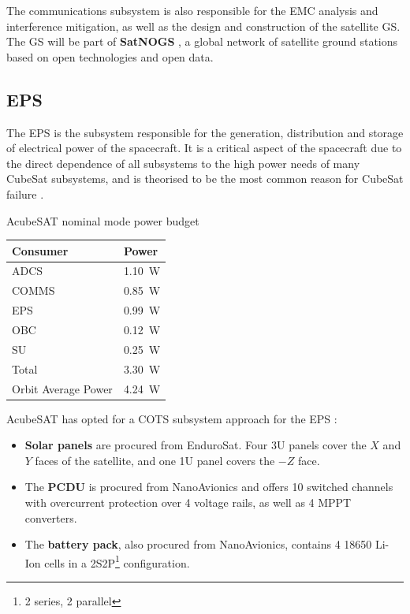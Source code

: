 \documentclass[a4paper,nobib]{tufte-book}
\begin{document}
The communications subsystem is also responsible for the \ac{EMC} analysis and interference mitigation, as well as the design and construction of the satellite \acl{GS}. The \acl{GS} will be part of \textbf{SatNOGS} \autocite{white_overview_satellite_2018}, a global network of satellite ground stations based on open technologies and open data.

\subsection{\acf{EPS}}
The \ac{EPS} is the subsystem responsible for the generation, distribution and storage of electrical power of the spacecraft. It is a critical aspect of the spacecraft due to the direct dependence of all subsystems to the high power needs of many CubeSat subsystems, and is theorised to be the most common reason for CubeSat failure \autocite{langer_reliability_cubesats_2016}.

\begin{margintable}
	\caption{AcubeSAT nominal mode power budget}
	\label{tab:power_budget}
	\begin{tabularx}{\linewidth}{@{}lX@{}}
		\toprule
		\textbf{Consumer}            & \textbf{Power}            \\ \midrule
		\acs{ADCS}          & \SI{1.10}{\watt} \\
		\acs{COMMS}         & \SI{0.85}{\watt} \\
		\acs{EPS}           & \SI{0.99}{\watt} \\
		\acs{OBC}           & \SI{0.12}{\watt} \\
		\acs{SU}            & \SI{0.25}{\watt} \\ \midrule
		Total               & \SI{3.30}{\watt} \\
		Orbit Average Power & \SI{4.24}{\watt} \\ \bottomrule
	\end{tabularx}
\end{margintable}

AcubeSAT has opted for a \ac{COTS} subsystem approach for the \ac{EPS} \autocite{DDJF_SYS}:
\begin{itemize}
	\item \textbf{Solar panels} are procured from EnduroSat. Four 3U panels cover the \(X\) and \(Y\) faces of the satellite, and one 1U panel covers the \(-Z\) face.
	\item The \textbf{\ac{PCDU}} is procured from NanoAvionics and offers 10 switched channels with overcurrent protection over 4 voltage rails, as well as 4 \ac{MPPT} converters.
	\item The \textbf{battery pack}, also procured from NanoAvionics, contains 4 18650 Li-Ion cells in a 2S2P\footnote{2 series, 2 parallel} configuration.
\end{itemize}
\end{document}
